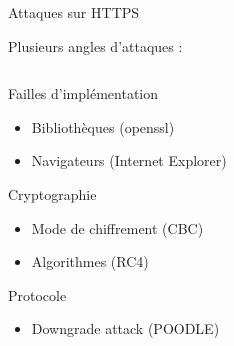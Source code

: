 \begin{frame}{Attaques sur HTTPS}

  {\Large \centerline{Plusieurs angles d'attaques :}}

  \begin{columns}
    \begin{column}{0.5\textwidth}
      \begin{exampleblock}{Failles d'implémentation}
        \begin{itemize}
        \item Bibliothèques (openssl)
        \item Navigateurs (Internet Explorer)
        \end{itemize}
      \end{exampleblock}

      \begin{exampleblock}{Cryptographie}
        \begin{itemize}
        \item Mode de chiffrement (CBC)
        \item Algorithmes (RC4)
        \end{itemize}
      \end{exampleblock}

      \begin{exampleblock}{Protocole}
        \begin{itemize}
        \item{Downgrade attack (POODLE)}
        \end{itemize}
      \end{exampleblock}
    \end{column}


\end{columns}
\end{frame}
